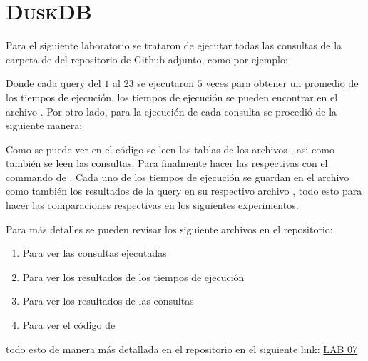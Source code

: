 \section*{\scshape\textbf{DuskDB}}

  Para el siguiente laboratorio se trataron de ejecutar todas las consultas
  de la carpeta de  del repositorio de Github adjunto,
  como por ejemplo:
  
  
  Donde cada query del $1$ al $23$ se ejecutaron $5$ veces para obtener un
  promedio de los tiempos de ejecución, los tiempos de ejecución se pueden
  encontrar en el archivo . Por otro lado, para
  la ejecución de cada consulta se procedió de la siguiente manera:


  Como se puede ver en el código  se leen las tablas de los archivos
  , asi como también se leen las consultas. Para finalmente hacer
  las  respectivas con el commando  de . Cada uno de
  los tiempos de ejecución se guardan en el archivo  como también
  los resultados de la query en su respectivo archivo , todo esto para
  hacer las comparaciones respectivas en los siguientes experimentos.

  Para más detalles se pueden revisar los siguiente archivos en el repositorio:
  
  \begin{enumerate}[\tiny$\blacksquare$]
    \item {} Para ver las consultas ejecutadas
    \item {} Para ver los resultados de los tiempos de ejecución
    \item {} Para ver los resultados de las consultas
    \item {} Para ver el código  de 
  \end{enumerate}

  todo esto de manera más detallada en el repositorio  en el
  siguiente link: \href{https://github.com/BTbackM/BIG_DATA/tree/main/WEEK_07/LAB_07/}{LAB 07}
